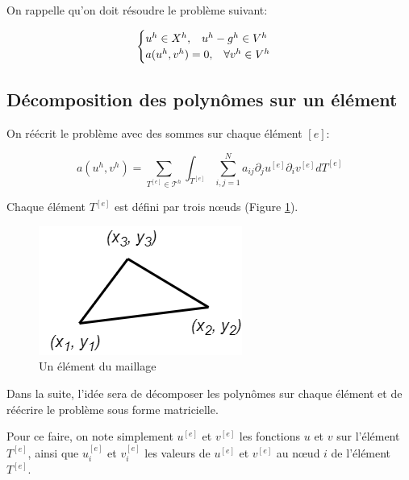 \documentclass{article}
\begin{document}
On rappelle qu'on doit résoudre le problème suivant:

\begin{equation}
    \begin{cases}
        u^h \in X^h, \hspace{0.3cm} u^h - g^h \in V^h \\
        a(u^h, v^h) = 0, \hspace{0.3cm} \forall v^h \in V^h
    \end{cases}   
\end{equation}

\newpage

\subsection{Décomposition des polynômes sur un élément}

On réécrit le problème avec des sommes sur chaque élément $[e]$:

\begin{equation}
    a(u^h, v^h) = \sum_{T^{[e]} \in \mathcal{T}^h} \int_{T^{[e]}}
    \sum_{i,j=1}^N a_{ij} \partial_j u ^{[e]} \partial_i v^{[e]} dT^{[e]}
    \label{eq:general_problem}
\end{equation}

Chaque élément $T^{[e]}$ est défini par trois
nœuds (Figure \ref{fig:element}).

\begin{figure}[h]
    \centering
    \includegraphics[scale=0.5]{img/element.png}
    \caption{Un élément du maillage}
    \label{fig:element}
\end{figure}

Dans la suite, l'idée sera de décomposer les polynômes
sur chaque élément et de réécrire le problème sous forme
matricielle.

Pour ce faire, on note simplement $u^{[e]}$ et $v^{[e]}$
les fonctions $u$ et $v$ sur l'élément $T^{[e]}$, ainsi que
$u^{[e]}_i$ et $v^{[e]}_i$ les valeurs de $u^{[e]}$ et $v^{[e]}$
au nœud $i$ de l'élément $T^{[e]}$.
\end{document}
